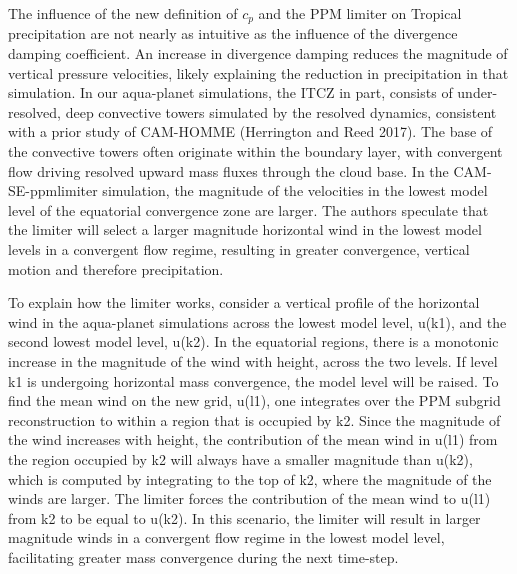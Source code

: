 The influence of the new definition of $c_p$ and the PPM limiter on Tropical precipitation are not nearly as intuitive as the influence of the divergence damping coefficient. An increase in divergence damping reduces the magnitude of vertical pressure velocities, likely explaining the reduction in precipitation in that simulation. In our aqua-planet simulations, the ITCZ in part, consists of under-resolved, deep convective towers simulated by the resolved dynamics, consistent with a prior study of CAM-HOMME (Herrington and Reed 2017). The base of the convective towers often originate within the boundary layer, with convergent flow driving resolved upward mass fluxes through the cloud base. In the CAM-SE-ppmlimiter simulation, the magnitude of the velocities in the lowest model level of the equatorial convergence zone are larger. The authors speculate that the limiter will select a larger magnitude horizontal wind in the lowest model levels in a convergent flow regime, resulting in greater convergence, vertical motion and therefore precipitation. 

To explain how the limiter works, consider a vertical profile of the horizontal wind in the aqua-planet simulations across the lowest model level, u(k1), and the second lowest model level, u(k2). In the equatorial regions, there is a monotonic increase in the magnitude of the wind with height, across the two levels. If level k1 is undergoing horizontal mass convergence, the model level will be raised. To find the mean wind on the new grid, u(l1), one integrates over the PPM subgrid reconstruction to within a region that is occupied by k2. Since the magnitude of the wind increases with height, the contribution of the mean wind in u(l1) from the region occupied by k2 will always have a smaller magnitude than u(k2), which is computed by integrating to the top of k2, where the magnitude of the winds are larger. The limiter forces the contribution of the mean wind to u(l1) from k2 to be equal to u(k2). In this scenario, the limiter will result in larger magnitude winds in a convergent flow regime in the lowest model level, facilitating greater mass convergence during the next time-step.

